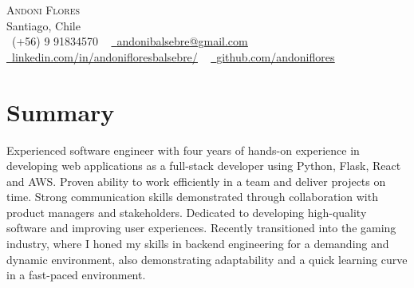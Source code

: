 \documentclass[letterpaper,11pt]{article}
\newcommand{\resumeSubHeadingListStart}{\begin{itemize}[leftmargin=0.0in, label={}]}
\newcommand{\resumeSubHeadingListEnd}{\end{itemize}}
\begin{document}

\begin{center}
    {\Huge \scshape Andoni Flores} \\ \vspace{1pt}
    Santiago, Chile \\ \vspace{1pt}
    \small \raisebox{-0.1\height}\faPhone\ (+56) 9 91834570 ~ \href{mailto:andonibalsebre@gmail.com}{\raisebox{-0.2\height}\faEnvelope\  \underline{andonibalsebre@gmail.com}} ~ 
    \href{https://linkedin.com/in/andonifloresbalsebre/}{\raisebox{-0.2\height}\faLinkedin\ \underline{linkedin.com/in/andonifloresbalsebre/}}  ~
    \href{https://github.com/andoniflores}{\raisebox{-0.2\height}\faGithub\ \underline{github.com/andoniflores}}
    \vspace{-8pt}
\end{center}

%
\section{Summary}
  \resumeSubHeadingListStart
    \small{\item{Experienced software engineer with four years of hands-on experience
        in developing web applications as a full-stack developer using Python, Flask,
        React and AWS. Proven ability to work efficiently in a team and deliver projects on time.
        Strong communication skills demonstrated through collaboration with product managers and
        stakeholders. Dedicated to developing high-quality software and improving user experiences.
        Recently transitioned into the gaming industry, where I honed my skills in backend engineering 
        for a demanding and dynamic environment, also demonstrating adaptability and a quick learning 
        curve in a fast-paced environment.}}
  \resumeSubHeadingListEnd

\end{document}
